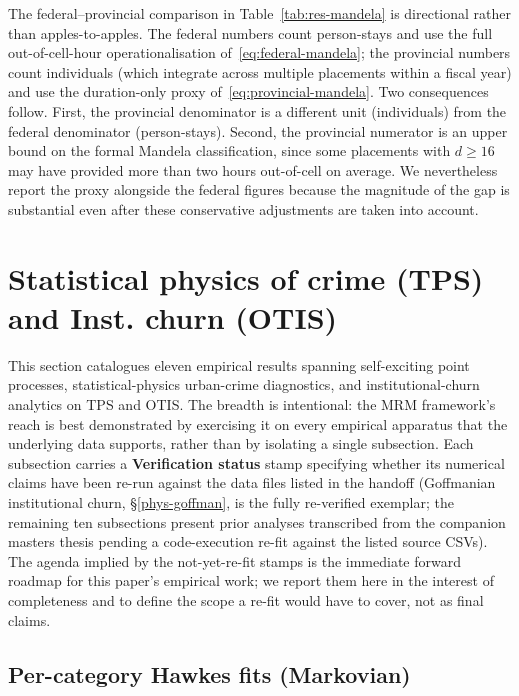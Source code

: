 \documentclass[article,shortnames,nojss]{jss}
\newcommand{\OTIS}{\textsf{OTIS}}
\newcommand{\TPS}{\textsf{TPS}}
\begin{document}
The federal--provincial comparison in Table~\ref{tab:res-mandela} is
directional rather than apples-to-apples. The federal numbers count
person-stays and use the full out-of-cell-hour operationalisation
of~\eqref{eq:federal-mandela}; the provincial numbers count individuals
(which integrate across multiple placements within a fiscal year)
and use the duration-only proxy of~\eqref{eq:provincial-mandela}.
Two consequences follow. First, the provincial denominator is a
different unit (individuals) from the federal denominator
(person-stays). Second, the provincial numerator is an upper bound on
the formal Mandela classification, since some placements with
$d \ge 16$ may have provided more than two hours out-of-cell on
average. We nevertheless report the proxy alongside the federal
figures because the magnitude of the gap is substantial even after
these conservative adjustments are taken into account.

\section[Statistical physics of crime (TPS) and Inst. churn (OTIS)]{Statistical physics of crime (\TPS{}) and Inst. churn (\OTIS{})}\label{sec:physics-results}

This section catalogues eleven empirical results spanning self-exciting
point processes, statistical-physics urban-crime diagnostics, and
institutional-churn analytics on \TPS{} and \OTIS{}.  The breadth is
intentional: the MRM framework's reach is best demonstrated by
exercising it on every empirical apparatus that the underlying data
supports, rather than by isolating a single subsection.  Each
subsection carries a \textbf{Verification status} stamp specifying
whether its numerical claims have been re-run against the data files
listed in the handoff (Goffmanian institutional churn,
§\ref{phys-goffman}, is the fully re-verified exemplar; the remaining
ten subsections present prior analyses transcribed from the
companion masters thesis pending a code-execution re-fit against the
listed source CSVs).  The agenda implied by the not-yet-re-fit stamps
is the immediate forward roadmap for this paper's empirical work; we
report them here in the interest of completeness and to define the
scope a re-fit would have to cover, not as final claims.

\subsection{Per-category Hawkes fits (Markovian)}\label{phys-hawkes}
\end{document}
